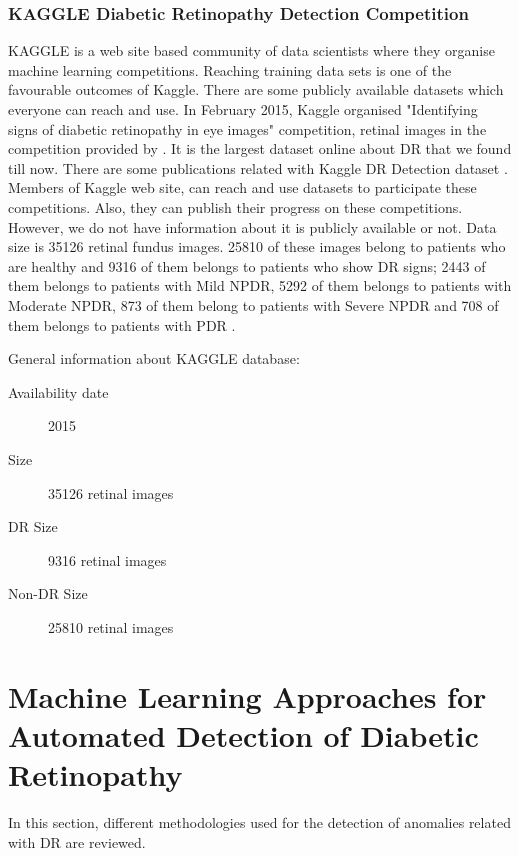 \subsubsection{KAGGLE Diabetic Retinopathy Detection Competition}
KAGGLE \citep{KAGGLE} is a web site based community of data scientists where they organise machine learning competitions. Reaching training data sets is one of the favourable outcomes of Kaggle. There are some publicly available datasets which everyone can reach and use. In February 2015, Kaggle organised "Identifying signs of diabetic retinopathy in eye images" competition, retinal images in the competition provided by \citet{eyePACS}. It is the largest dataset online about DR that we found till now. There are some publications related with Kaggle DR Detection dataset \citep{albanautomated} \citep{van2016fast}. Members of Kaggle web site, can reach and use datasets to participate these competitions. Also, they can publish their progress on these competitions. However, we do not have information about it is publicly available or not. Data size is 35126 retinal fundus images\citep{van2016fast}. 25810 of these images belong to patients who are healthy and 9316 of them belongs to patients who show DR signs; 2443 of them belongs to patients with Mild NPDR, 5292 of them belongs to patients with Moderate NPDR, 873 of them belong to patients with Severe NPDR and 708 of them belongs to patients with PDR \citep{albanautomated}. 


General information about KAGGLE database:
\begin{description}
    \item[Availability date] 2015
    \item[Size] 35126 retinal images
    \item[DR Size] 9316 retinal images
    \item[Non-DR Size] 25810 retinal images
\end{description}

\section{Machine Learning Approaches for Automated Detection of Diabetic Retinopathy}
In this section, different methodologies used for the detection of anomalies related with DR are reviewed. 

